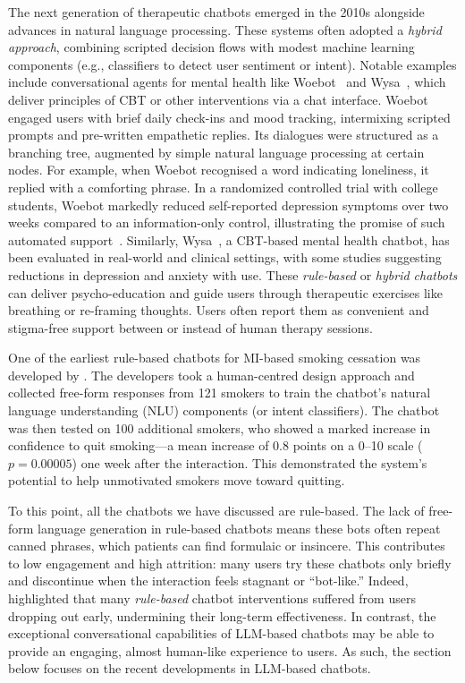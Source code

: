 The next generation of therapeutic chatbots emerged in the 2010s alongside advances in natural language processing. These systems often adopted a \emph{hybrid approach}, combining scripted decision flows with modest machine learning components (e.g., classifiers to detect user sentiment or intent). Notable examples include conversational agents for mental health like Woebot~\cite{Fitzpatrick2017} and Wysa~\cite{Chang2024}, which deliver principles of CBT or other interventions via a chat interface. Woebot engaged users with brief daily check-ins and mood tracking, intermixing scripted prompts and pre-written empathetic replies. Its dialogues were structured as a branching tree, augmented by simple natural language processing at certain nodes. For example, when Woebot recognised a word indicating loneliness, it replied with a comforting phrase. In a randomized controlled trial with college students, Woebot markedly reduced self-reported depression symptoms over two weeks compared to an information-only control, illustrating the promise of such automated support~\cite{Fitzpatrick2017}. Similarly, Wysa~\cite{Chang2024}, a CBT-based mental health chatbot, has been evaluated in real-world and clinical settings, with some studies suggesting reductions in depression and anxiety with use. These \emph{rule-based} or \emph{hybrid chatbots} can deliver psycho-education and guide users through therapeutic exercises like breathing or re-framing thoughts. Users often report them as convenient and stigma-free support between or instead of human therapy sessions.

One of the earliest rule-based chatbots for MI-based smoking cessation was developed by \citet{Almusharraf_2019}. The developers took a human-centred design approach and collected free-form responses from 121 smokers to train the chatbot's natural language understanding (NLU) components (or intent classifiers). The chatbot was then tested on 100 additional smokers, who showed a marked increase in confidence to quit smoking---a mean increase of 0.8 points on a 0–10 scale ($p=0.00005$) one week after the interaction. This demonstrated the system's potential to help unmotivated smokers move toward quitting.

To this point, all the chatbots we have discussed are rule-based. The lack of free-form language generation in rule-based chatbots means these bots often repeat canned phrases, which patients can find formulaic or insincere. This contributes to low engagement and high attrition: many users try these chatbots only briefly and discontinue when the interaction feels stagnant or ``bot-like.'' Indeed, \citet{LIMPANOPPARAT2024100081} highlighted that many \emph{rule-based} chatbot interventions suffered from users dropping out early, undermining their long-term effectiveness. In contrast, the exceptional conversational capabilities of LLM-based chatbots may be able to provide an engaging, almost human-like experience to users. As such, the section below focuses on the recent developments in LLM-based chatbots.


